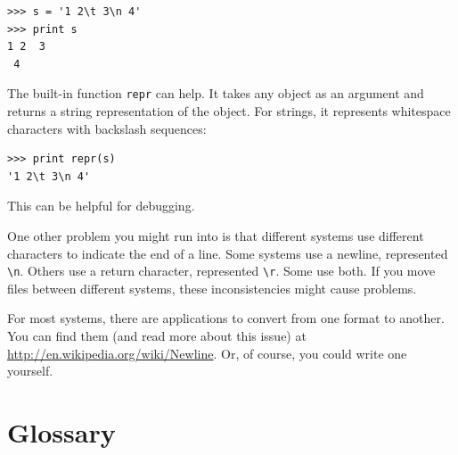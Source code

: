 \documentclass[10pt]{book}
\begin{document}
\begin{verbatim}
>>> s = '1 2\t 3\n 4'
>>> print s
1 2	 3
 4
\end{verbatim}

The built-in function {\tt repr} can help.  It takes any object as an
argument and returns a string representation of the object.  For
strings, it represents whitespace
characters with backslash sequences:

\begin{verbatim}
>>> print repr(s)
'1 2\t 3\n 4'
\end{verbatim}

This can be helpful for debugging.

One other problem you might run into is that different systems
use different characters to indicate the end of a line.  Some
systems use a newline, represented \verb"\n".  Others use
a return character, represented \verb"\r".  Some use both.
If you move files between different systems, these inconsistencies
might cause problems.

For most systems, there are applications to convert from one
format to another.  You can find them (and read more about this
issue) at \url{http://en.wikipedia.org/wiki/Newline}.  Or, of course, you
could write one yourself.


\section{Glossary}
\end{document}
